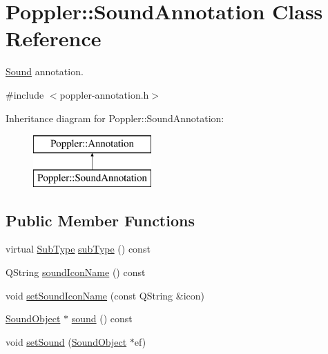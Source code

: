 \hypertarget{class_poppler_1_1_sound_annotation}{}\section{Poppler\+:\+:Sound\+Annotation Class Reference}
\label{class_poppler_1_1_sound_annotation}


\hyperlink{class_sound}{Sound} annotation.  




{\ttfamily \#include $<$poppler-\/annotation.\+h$>$}

Inheritance diagram for Poppler\+:\+:Sound\+Annotation\+:\begin{figure}[H]
\begin{center}
\leavevmode
\includegraphics[height=2.000000cm]{class_poppler_1_1_sound_annotation}
\end{center}
\end{figure}
\subsection*{Public Member Functions}
\begin{DoxyCompactItemize}
\item 
virtual \hyperlink{class_poppler_1_1_annotation_a2d592999c330949d64679cfa9e81113f}{Sub\+Type} \hyperlink{class_poppler_1_1_sound_annotation_af66d5ce084a1ac8ad21a2102942bf909}{sub\+Type} () const
\item 
Q\+String \hyperlink{class_poppler_1_1_sound_annotation_a7d92e049c31d42255995411463bb0fb0}{sound\+Icon\+Name} () const
\item 
void \hyperlink{class_poppler_1_1_sound_annotation_a704b034328ff00f43f9f050ba1765f56}{set\+Sound\+Icon\+Name} (const Q\+String \&icon)
\item 
\hyperlink{class_poppler_1_1_sound_object}{Sound\+Object} $\ast$ \hyperlink{class_poppler_1_1_sound_annotation_a91dc567a9d1848f7c9cd0327c7f83fd9}{sound} () const
\item 
void \hyperlink{class_poppler_1_1_sound_annotation_a2e2bd7ca5cd1713b3623682d1e884844}{set\+Sound} (\hyperlink{class_poppler_1_1_sound_object}{Sound\+Object} $\ast$ef)
\end{DoxyCompactItemize}
